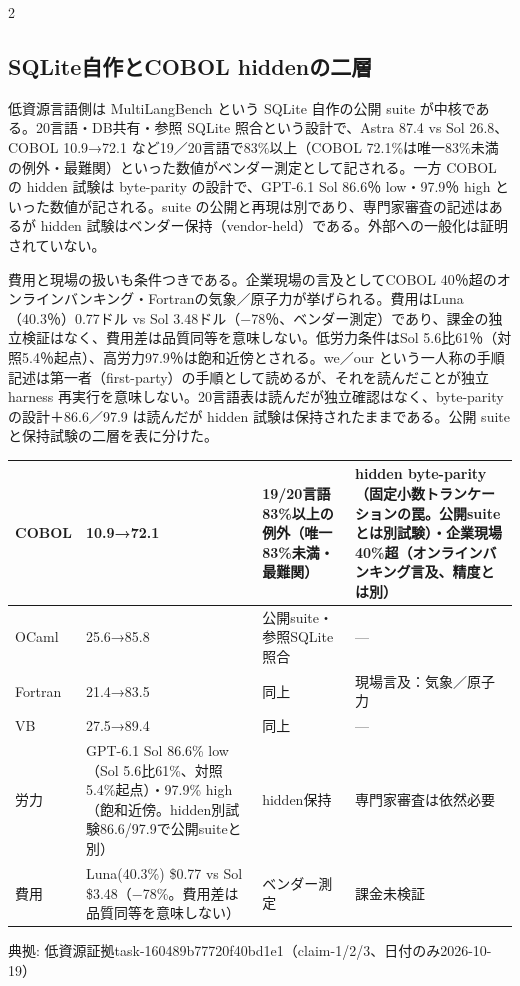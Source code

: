 \documentclass[lualatex,a4paper,10pt]{jlreq}
\begin{document}
\begin{multicols}{2} %


\subsection*{SQLite自作とCOBOL hiddenの二層}


低資源言語側は MultiLangBench という SQLite 自作の公開 suite が中核である。20言語・DB共有・参照 SQLite 照合という設計で、Astra 87.4 vs Sol 26.8、COBOL 10.9→72.1 など19／20言語で83\%以上（COBOL 72.1\%は唯一83\%未満の例外・最難関）といった数値がベンダー測定として記される。一方 COBOL の hidden 試験は byte-parity の設計で、GPT-6.1 Sol 86.6％ low・97.9％ high といった数値が記される。suite の公開と再現は別であり、専門家審査の記述はあるが hidden 試験はベンダー保持（vendor-held）である。外部への一般化は証明されていない。


費用と現場の扱いも条件つきである。企業現場の言及としてCOBOL 40％超のオンラインバンキング・Fortranの気象／原子力が挙げられる。費用はLuna（40.3％）0.77ドル vs Sol 3.48ドル（−78％、ベンダー測定）であり、課金の独立検証はなく、費用差は品質同等を意味しない。低労力条件はSol 5.6比61％（対照5.4％起点）、高労力97.9％は飽和近傍とされる。we／our という一人称の手順記述は第一者（first-party）の手順として読めるが、それを読んだことが独立 harness 再実行を意味しない。20言語表は読んだが独立確認はなく、byte-parity の設計＋86.6／97.9 は読んだが hidden 試験は保持されたままである。公開 suite と保持試験の二層を表に分けた。


\end{multicols} %
{\centering\footnotesize
{}
\begin{tabularx}{0.96\linewidth}{@{}lXXX@{}}
\toprule
COBOL & 10.9→72.1 & 19/20言語83\%以上の例外（唯一83\%未満・最難関） & hidden byte-parity（固定小数トランケーションの罠。公開suiteとは別試験）・企業現場40\%超（オンラインバンキング言及、精度とは別） \\
\midrule
OCaml & 25.6→85.8 & 公開suite・参照SQLite照合 & — \\
Fortran & 21.4→83.5 & 同上 & 現場言及：気象／原子力 \\
VB & 27.5→89.4 & 同上 & — \\
労力 & GPT-6.1 Sol 86.6\% low（Sol 5.6比61\%、対照5.4\%起点）・97.9\% high（飽和近傍。hidden別試験86.6/97.9で公開suiteと別） & hidden保持 & 専門家審査は依然必要 \\
費用 & Luna(40.3\%) \$0.77 vs Sol \$3.48（−78\%。費用差は品質同等を意味しない） & ベンダー測定 & 課金未検証 \\
\bottomrule
\end{tabularx}
{\scriptsize\color{SurveyMuted} 典拠: 低資源証拠task-160489b77720f40bd1e1（claim-1/2/3、日付のみ2026-10-19）\par}
} %
\end{document}
